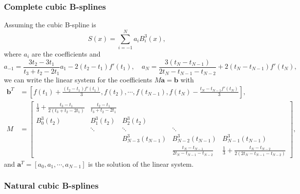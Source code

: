\documentclass[a4paper]{article}
\theoremstyle{definition}
\begin{document}
\subsubsection{Complete cubic B-splines}
\label{sec:complete-cubic-b-splines}

Assuming the cubic B-spline is 
\begin{equation}
  S(x) = \sum_{i = -1}^N a_i B_i^3(x),
  \label{eq:complete-cubic-b-spline}
\end{equation}
where $a_i$ are the coefficients and 
\begin{equation}
  a_{-1} = \frac{3t_2 - 3t_1}{t_3 + t_2 - 2t_1} a_1 - 2(t_2 - t_1)f'(t_1),\quad a_N = \frac{3(t_N - t_{N - 1})}{2t_N - t_{N - 1} - t_{N - 2}} + 2(t_N - t_{N - 1})f'(t_N),
  \label{eq:complete-cubic-b-spline-coefficients}
\end{equation}
we can write the linear system for the coefficients $M\mathbf{a} = \mathbf{b}$ with
\begin{equation}
  \begin{aligned}
    \mathbf{b}^T &= [f(t_1) + \frac{(t_2 - t_1)f'(t_1)}{3}, f(t_2), \cdots, f(t_{N - 1}), f(t_N) - \frac{t_N - t_{N - 1}f'(t_N)}{3}], \\
    M &= \begin{bmatrix}
      \frac{1}{3} + \frac{t_3 - t_1}{2(t_3 + t_2 - 2t_1)} & \frac{t_2 - t_1}{t_3 + t_2 - 2t_1} &    &    &    \\
      B_0^3(t_2) & B_1^3(t_2) & B_2^3(t_2) &    &    \\
        & \ddots & \ddots & \ddots &    \\
        &    & B_{N - 3}^3(t_{N - 1}) & B_{N - 2}^3(t_{N - 1}) & B_{N - 1}^3(t_{N - 1}) \\
        &    &    & \frac{t_N - t_{N - 1}}{2t_N - t_{N - 1} - t_{N - 2}} & \frac{1}{3} + \frac{t_N - t_{N - 2}}{2(2t_N - t_{N - 1} - t_{N - 2})}
    \end{bmatrix},
  \end{aligned}
  \label{eq:complete-cubic-b-spline-linear-system}
\end{equation}
and $\mathbf{a}^T = [a_0, a_1, \cdots, a_{N - 1}]$ is the solution of the linear system.

\subsubsection{Natural cubic B-splines}
\label{sec:natural-cubic-b-splines}
\end{document}
